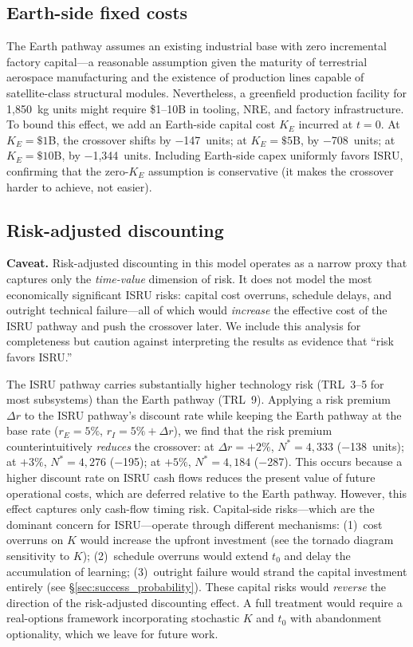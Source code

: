 \documentclass[preprint,12pt]{elsarticle}
\begin{document}
\subsection{Earth-side fixed costs}
\label{sec:earth_capex}

The Earth pathway assumes an existing industrial base with zero incremental factory capital---a reasonable assumption given the maturity of terrestrial aerospace manufacturing and the existence of production lines capable of satellite-class structural modules. Nevertheless, a greenfield production facility for 1{,}850~kg units might require \$1--10B in tooling, NRE, and factory infrastructure. To bound this effect, we add an Earth-side capital cost $K_E$ incurred at $t = 0$. At $K_E = \$1$B, the crossover shifts by $-$147~units; at $K_E = \$5$B, by $-$708~units; at $K_E = \$10$B, by $-$1{,}344~units. Including Earth-side capex uniformly favors ISRU, confirming that the zero-$K_E$ assumption is conservative (it makes the crossover harder to achieve, not easier).

\subsection{Risk-adjusted discounting}
\label{sec:risk_premium}

\textbf{Caveat.} Risk-adjusted discounting in this model operates as a narrow proxy that captures only the \emph{time-value} dimension of risk. It does not model the most economically significant ISRU risks: capital cost overruns, schedule delays, and outright technical failure---all of which would \emph{increase} the effective cost of the ISRU pathway and push the crossover later. We include this analysis for completeness but caution against interpreting the results as evidence that ``risk favors ISRU.''

The ISRU pathway carries substantially higher technology risk (TRL~3--5 for most subsystems) than the Earth pathway (TRL~9). Applying a risk premium $\Delta r$ to the ISRU pathway's discount rate while keeping the Earth pathway at the base rate ($r_E = 5\%$, $r_I = 5\% + \Delta r$), we find that the risk premium counterintuitively \emph{reduces} the crossover: at $\Delta r = +2\%$, $N^* = 4{,}333$ ($-$138~units); at $+3\%$, $N^* = 4{,}276$ ($-$195); at $+5\%$, $N^* = 4{,}184$ ($-$287). This occurs because a higher discount rate on ISRU cash flows reduces the present value of future operational costs, which are deferred relative to the Earth pathway. However, this effect captures only cash-flow timing risk. Capital-side risks---which are the dominant concern for ISRU---operate through different mechanisms: (1)~cost overruns on $K$ would increase the upfront investment (see the tornado diagram sensitivity to $K$); (2)~schedule overruns would extend $t_0$ and delay the accumulation of learning; (3)~outright failure would strand the capital investment entirely (see \S\ref{sec:success_probability}). These capital risks would \emph{reverse} the direction of the risk-adjusted discounting effect. A full treatment would require a real-options framework \cite{dixit1994} incorporating stochastic $K$ and $t_0$ with abandonment optionality, which we leave for future work.
\end{document}
